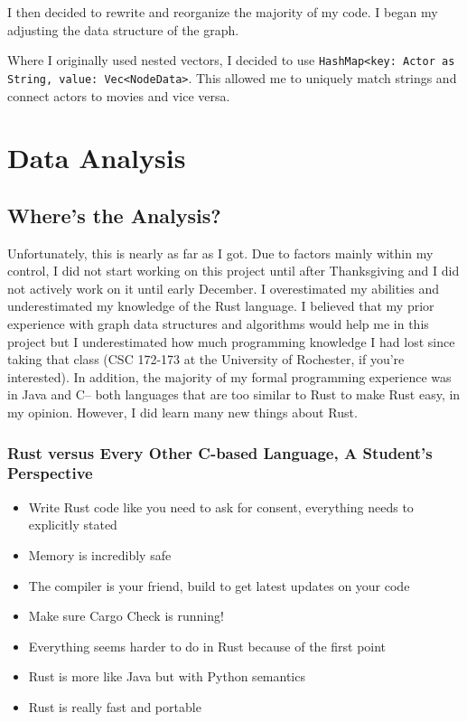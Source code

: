 \documentclass[12pt,letterpaper]{article}
\begin{document}
I then decided to rewrite and reorganize the majority of my code.  I began my adjusting the data structure of the graph. 

Where I originally used nested vectors,  I decided to use \texttt{HashMap<key: Actor as String, value: Vec<NodeData>}.  This allowed me to uniquely match strings and connect actors to movies and vice versa. 

\section{Data Analysis}

\subsection{Where's the Analysis?}

Unfortunately,  this is nearly as far as I got.  Due to factors mainly within my control,  I did not start working on this project until after Thanksgiving and I did not actively work on it until early December.  I overestimated my abilities and underestimated my knowledge of the Rust language.  I believed that my prior experience with graph data structures and algorithms would help me in this project but I underestimated how much programming knowledge I had lost since taking that class (CSC 172-173 at the University of Rochester, if you're interested). In addition, the majority of my formal programming experience was in Java and C-- both languages that are too similar to Rust to make Rust easy, in my opinion. However, I did learn many new things about Rust. 

\subsubsection{Rust versus Every Other C-based Language,  A Student's Perspective}
\begin{itemize}
	\item Write Rust code like you need to ask for consent, everything needs to explicitly stated 
	\item Memory is incredibly safe 
	\item The compiler is your friend,  build to get latest updates on your code 
	\item Make sure Cargo Check is running! 
	\item Everything seems harder to do in Rust because of the first point 
	\item Rust is more like Java but with Python semantics   
	\item Rust is really fast and portable 
\end{itemize}
\end{document}
